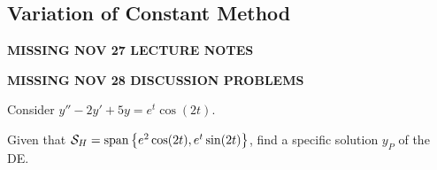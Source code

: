 	\subsection{Variation of Constant Method}


	\begin{remark}
		\textbf{MISSING NOV 27 LECTURE NOTES}

		\textbf{MISSING NOV 28 DISCUSSION PROBLEMS}
	\end{remark}

	\begin{example}
		Consider $y''-2y'+5y=e^t\cos(2t)$.

		Given that $\mathcal{S}_H = \mathrm{span}\left\{e^2\cos(2t), e^t\sin(2t)\right\}$, find a specific solution $y_P$ of the DE.
	\end{example}


